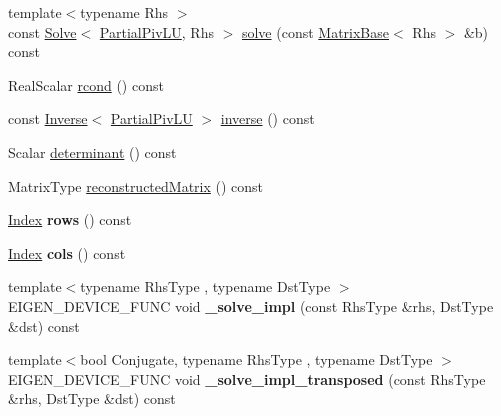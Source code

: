 \begin{DoxyCompactItemize}
\item 
{\footnotesize template$<$typename Rhs $>$ }\\const \mbox{\hyperlink{class_eigen_1_1_solve}{Solve}}$<$ \mbox{\hyperlink{class_eigen_1_1_partial_piv_l_u}{Partial\+Piv\+LU}}, Rhs $>$ \mbox{\hyperlink{class_eigen_1_1_partial_piv_l_u_a49247bd2f742a46bca1f9c2bf1b19ad8}{solve}} (const \mbox{\hyperlink{class_eigen_1_1_matrix_base}{Matrix\+Base}}$<$ Rhs $>$ \&b) const
\item 
Real\+Scalar \mbox{\hyperlink{class_eigen_1_1_partial_piv_l_u_a472b46d5d9ff7c328e1dccc13805f690}{rcond}} () const
\item 
const \mbox{\hyperlink{class_eigen_1_1_inverse}{Inverse}}$<$ \mbox{\hyperlink{class_eigen_1_1_partial_piv_l_u}{Partial\+Piv\+LU}} $>$ \mbox{\hyperlink{class_eigen_1_1_partial_piv_l_u_aef983470f92aba829e861e32e68681b5}{inverse}} () const
\item 
Scalar \mbox{\hyperlink{class_eigen_1_1_partial_piv_l_u_a54c3d39c9b46ff485a8d2140b9b23193}{determinant}} () const
\item 
Matrix\+Type \mbox{\hyperlink{class_eigen_1_1_partial_piv_l_u_aba7f1ee83537b0d240ebf206503a4920}{reconstructed\+Matrix}} () const
\item 
\mbox{\label{class_eigen_1_1_partial_piv_l_u_ad7a86697af02b65b13939d319e1d6840}} 
\mbox{\hyperlink{struct_eigen_1_1_eigen_base_a554f30542cc2316add4b1ea0a492ff02}{Index}} {\bfseries rows} () const
\item 
\mbox{\label{class_eigen_1_1_partial_piv_l_u_a9aaa1eaccfb6ee5dfab78cb6e190929a}} 
\mbox{\hyperlink{struct_eigen_1_1_eigen_base_a554f30542cc2316add4b1ea0a492ff02}{Index}} {\bfseries cols} () const
\item 
\mbox{\label{class_eigen_1_1_partial_piv_l_u_ab7e88bbaf3bb0172b9be97036be68999}} 
{\footnotesize template$<$typename Rhs\+Type , typename Dst\+Type $>$ }\\E\+I\+G\+E\+N\+\_\+\+D\+E\+V\+I\+C\+E\+\_\+\+F\+U\+NC void {\bfseries \+\_\+solve\+\_\+impl} (const Rhs\+Type \&rhs, Dst\+Type \&dst) const
\item 
\mbox{\label{class_eigen_1_1_partial_piv_l_u_a6e63a73644ef9fbe7856c8169287c7f5}} 
{\footnotesize template$<$bool Conjugate, typename Rhs\+Type , typename Dst\+Type $>$ }\\E\+I\+G\+E\+N\+\_\+\+D\+E\+V\+I\+C\+E\+\_\+\+F\+U\+NC void {\bfseries \+\_\+solve\+\_\+impl\+\_\+transposed} (const Rhs\+Type \&rhs, Dst\+Type \&dst) const
\end{DoxyCompactItemize}
